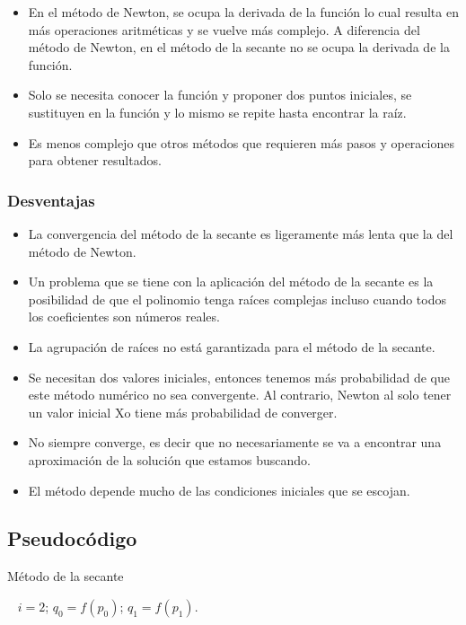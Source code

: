 \begin{itemize}
  \item En el método de Newton, se ocupa la derivada de la función lo cual resulta en más operaciones aritméticas y se vuelve más complejo. A diferencia del método de Newton, en el método de la secante no se ocupa la derivada de la función.
  \item Solo se necesita conocer la función y proponer dos puntos iniciales, se sustituyen en la función y lo mismo se repite hasta encontrar la raíz.
  \item Es menos complejo que otros métodos que requieren más pasos y operaciones para obtener resultados.
\end{itemize}

\subsubsection{Desventajas}

\begin{itemize}
  \item La convergencia del método de la secante es ligeramente más lenta que la del método de Newton. 
  \item Un problema que se tiene con la aplicación del método de la secante es la posibilidad de que el polinomio tenga raíces complejas incluso cuando todos los coeficientes son números reales. 
  \item La agrupación de raíces no está garantizada para el método de la secante.
  \item Se necesitan dos valores iniciales, entonces tenemos más probabilidad de que este método numérico no sea convergente. Al contrario, Newton al solo tener un valor inicial Xo tiene más probabilidad de converger.
  \item No siempre converge, es decir que no necesariamente se va a encontrar una aproximación de la solución que estamos buscando.
  \item El método depende mucho de las condiciones iniciales que se escojan.
\end{itemize}

\subsection{Pseudocódigo}

\begin{algorithm}
    
    \caption{Método de la secante} 
    \
    $i = 2$; 
    \BlankLine
    $q_0 = f(p_0)$; 
    \BlankLine
    $q_1 = f(p_1)$.
    \BlankLine
    \Return {}
    \end{algorithm}

